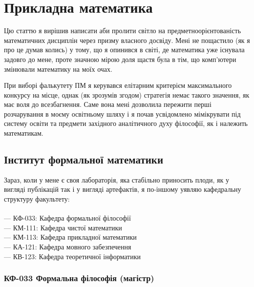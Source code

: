 \section{Прикладна математика}

Цю статтю я вирішив написати аби пролити світло на
предметноорієнтованість математичних дисциплін через
призму власного досвіду. Мені не пощастило (як я про
це думав колись) у тому, що я опинився в світі, де
математика уже існувала задовго до мене, проте значною
мірою доля щастя була в тім, що комп'ютери змінювали
математику на моїх очах.

При виборі фалькутету ПМ я керувався елітарним критерієм
максимального конкурсу на місце, однак (як зрозумів згодом)
стратегія немає такого значення, як має воля до всезбагнення.
Саме вона мені дозволила пережити перші розчарування в моєму
освітньому шляху і я почав усвідомлено мімікрувати під систему
освіти та предмети західного аналітичного духу філософії,
як і належить математикам.

\subsection*{Інститут формальної математики}

Зараз, коли у мене є своя лабораторія, яка стабільно приносить плоди,
як у вигляді публікацій так і у вигляді артефактів, я по-іншому
уявляю кафедральну структуру факультету:
\\
\\
\noindent--- КФ-033: Кафедра формальної філософії\\
--- КМ-111: Кафедра чистої математики\\
--- КМ-113: Кафедра прикладної математики\\
--- КА-121: Кафедра мовного забезпечення\\
--- КВ-123: Кафедра теоретичної інформатики\\

\subsubsection*{КФ-033 Формальна філософія (магістр)}

